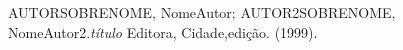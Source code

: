 \documentclass[a4paper,12pt]{article}
\begin{document}
\begin{thebibliography}{3} %

 AUTORSOBRENOME, NomeAutor; AUTOR2SOBRENOME, NomeAutor2.\textit{título} Editora, Cidade,edição. (1999).

\end{thebibliography}
\end{document}
